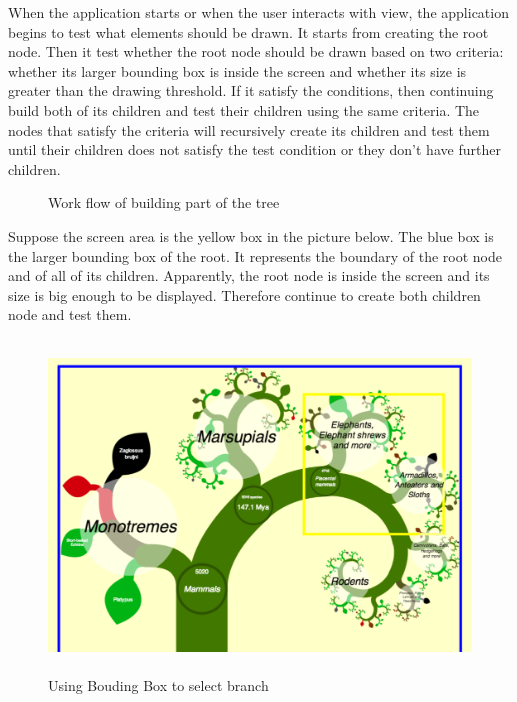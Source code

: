 \documentclass[MSc]{icldt}
\begin{document}
When the application starts or when the user interacts with view, the application begins to test what elements should be drawn. It starts from creating the root node. Then it test whether the root node should be drawn based on two criteria: whether its larger bounding box is inside the screen and whether its size is greater than the drawing threshold. If it satisfy the conditions, then continuing build both of its children and test their children using the same criteria. The nodes that satisfy the criteria will recursively create its children and test them until their children does not satisfy the test condition or they don't have further children. 

\begin{figure} [H]
\caption{Work flow of building part of the tree}
\end{figure}

Suppose the screen area is the yellow box in the picture below. The blue box is the larger bounding box of the root. It represents the boundary of the root node and of all of its children. Apparently, the root node is inside the screen and its size is big enough to be displayed. Therefore continue to create both children node and test them. 

\begin{figure}[H]
  \centering
  \includegraphics [width=15cm,height=8.8cm]{ScreenAndBounding1}
  \caption{Using Bouding Box to select branch}
  \label{fig:mammal}
\end{figure}
\end{document}
